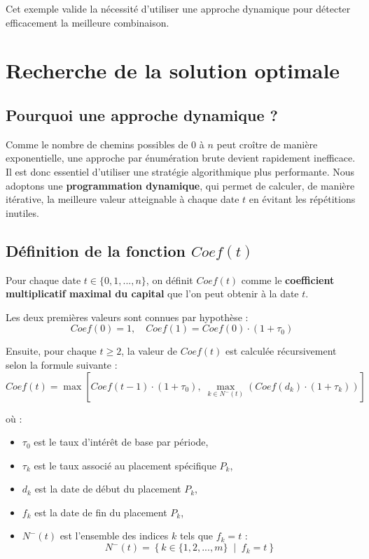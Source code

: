 \documentclass[a4paper,11pt]{article}
\begin{document}
    Cet exemple valide la nécessité d’utiliser une approche dynamique pour détecter efficacement la meilleure combinaison.



    \section{Recherche de la solution optimale}

\subsection{Pourquoi une approche dynamique ?}

Comme le nombre de chemins possibles de 0 à $n$ peut croître de manière exponentielle, une approche par énumération brute devient rapidement inefficace. Il est donc essentiel d’utiliser une stratégie algorithmique plus performante.  
Nous adoptons une \textbf{programmation dynamique}, qui permet de calculer, de manière itérative, la meilleure valeur atteignable à chaque date $t$ en évitant les répétitions inutiles.

\subsection{Définition de la fonction $Coef(t)$}

Pour chaque date $t \in \{0, 1, ..., n\}$, on définit $Coef(t)$ comme le \textbf{coefficient multiplicatif maximal du capital} que l’on peut obtenir à la date $t$.

Les deux premières valeurs sont connues par hypothèse :
\[
Coef(0) = 1, \quad Coef(1) = Coef(0) \cdot (1 + \tau_0)
\]

Ensuite, pour chaque $t \geq 2$, la valeur de $Coef(t)$ est calculée récursivement selon la formule suivante :
\[
Coef(t) = \max \left[
Coef(t-1) \cdot (1 + \tau_0), \;
\max_{k \in N^-(t)} \left( Coef(d_k) \cdot (1 + \tau_k) \right)
\right]
\]

où :

\begin{itemize}
    \item $\tau_0$ est le taux d’intérêt de base par période,
    \item $\tau_k$ est le taux associé au placement spécifique $P_k$,
    \item $d_k$ est la date de début du placement $P_k$,
    \item $f_k$ est la date de fin du placement $P_k$,
    \item $N^-(t)$ est l’ensemble des indices $k$ tels que $f_k = t$ :
    \[
    N^-(t) = \left\{ k \in \{1, 2, ..., m\} \;\middle|\; f_k = t \right\}
    \]
\end{itemize}
\end{document}
